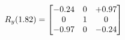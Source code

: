 \documentclass[preview]{standalone}
\begin{document}
\begin{align*}
\special{dvisvgm:raw <g id='unique000'>}R_{y}(1.82) = \begin{bmatrix}-0.24 & 0 & +0.97 \\0 & 1 & 0 \\-0.97 & 0 & -0.24\end{bmatrix}\special{dvisvgm:raw </g>}
\end{align*}
\end{document}
